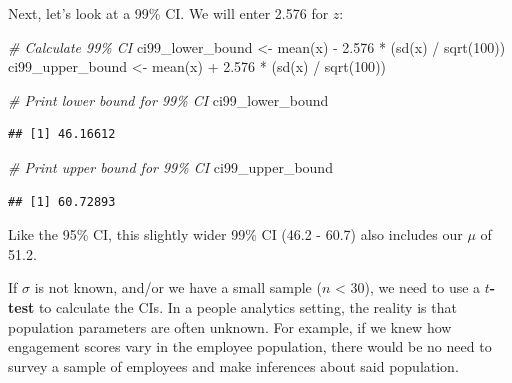 \documentclass[
]{book}
\newenvironment{Shaded}{\begin{snugshade}}{\end{snugshade}}
\newcommand{\CommentTok}[1]{\textcolor[rgb]{0.56,0.35,0.01}{\textit{#1}}}
\newcommand{\DecValTok}[1]{\textcolor[rgb]{0.00,0.00,0.81}{#1}}
\newcommand{\FloatTok}[1]{\textcolor[rgb]{0.00,0.00,0.81}{#1}}
\newcommand{\FunctionTok}[1]{\textcolor[rgb]{0.00,0.00,0.00}{#1}}
\newcommand{\NormalTok}[1]{#1}
\newcommand{\OtherTok}[1]{\textcolor[rgb]{0.56,0.35,0.01}{#1}}
\newcommand{\SpecialCharTok}[1]{\textcolor[rgb]{0.00,0.00,0.00}{#1}}
\begin{document}
Next, let's look at a 99\% CI. We will enter 2.576 for \(z\):

\begin{Shaded}
\begin{Highlighting}[]
\CommentTok{\# Calculate 99\% CI}
\NormalTok{ci99\_lower\_bound }\OtherTok{\textless{}{-}} \FunctionTok{mean}\NormalTok{(x) }\SpecialCharTok{{-}} \FloatTok{2.576} \SpecialCharTok{*}\NormalTok{ (}\FunctionTok{sd}\NormalTok{(x) }\SpecialCharTok{/} \FunctionTok{sqrt}\NormalTok{(}\DecValTok{100}\NormalTok{))}
\NormalTok{ci99\_upper\_bound }\OtherTok{\textless{}{-}} \FunctionTok{mean}\NormalTok{(x) }\SpecialCharTok{+} \FloatTok{2.576} \SpecialCharTok{*}\NormalTok{ (}\FunctionTok{sd}\NormalTok{(x) }\SpecialCharTok{/} \FunctionTok{sqrt}\NormalTok{(}\DecValTok{100}\NormalTok{))}
\end{Highlighting}
\end{Shaded}

\begin{Shaded}
\begin{Highlighting}[]
\CommentTok{\# Print lower bound for 99\% CI}
\NormalTok{ci99\_lower\_bound}
\end{Highlighting}
\end{Shaded}

\begin{verbatim}
## [1] 46.16612
\end{verbatim}

\begin{Shaded}
\begin{Highlighting}[]
\CommentTok{\# Print upper bound for 99\% CI}
\NormalTok{ci99\_upper\_bound}
\end{Highlighting}
\end{Shaded}

\begin{verbatim}
## [1] 60.72893
\end{verbatim}

Like the 95\% CI, this slightly wider 99\% CI (46.2 - 60.7) also includes our \(\mu\) of 51.2.

If \(\sigma\) is not known, and/or we have a small sample (\(n\) \textless{} 30), we need to use a \(t\)\textbf{-test} to calculate the CIs. In a people analytics setting, the reality is that population parameters are often unknown. For example, if we knew how engagement scores vary in the employee population, there would be no need to survey a sample of employees and make inferences about said population.
\end{document}
